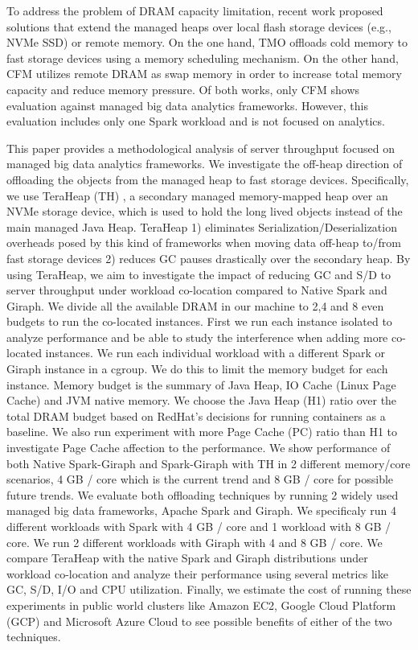 To address the problem of DRAM capacity limitation, recent work
proposed solutions that extend the managed heaps over local flash
storage devices (e.g., NVMe SSD) or remote memory. On the one hand,
TMO \cite{TMO} offloads cold memory to fast storage devices using
a memory scheduling mechanism. On the other hand, CFM \cite{CFM}
utilizes remote DRAM as swap memory in order to increase total memory capacity
and reduce memory pressure. Of both works, only CFM shows
evaluation against managed big data analytics frameworks. However, this evaluation
includes only one Spark workload and is not focused on analytics.

This paper provides a methodological analysis of server throughput 
focused on managed big data analytics frameworks.
We investigate the off-heap direction of offloading the objects from the
managed heap to fast storage devices.
Specifically, we use TeraHeap (TH) \cite{TeraHeap}, a secondary managed
memory-mapped heap over an NVMe storage device, which is used to hold
the long lived objects instead of the main managed Java Heap. TeraHeap
1) eliminates Serialization/Deserialization overheads posed by this
kind of frameworks when moving data off-heap to/from fast storage
devices 2) reduces GC pauses drastically over the secondary heap. By
using TeraHeap, we aim to investigate the impact of reducing GC and S/D
to server throughput under workload co-location compared to Native Spark
and Giraph. We divide all the available DRAM
in our machine to 2,4 and 8 even budgets to run the co-located instances.
First we run each instance isolated to analyze performance and be able to study the interference when adding more
co-located instances. We run each individual workload with a different Spark or Giraph instance in a cgroup.
We do this to limit the memory budget for each instance. Memory budget is
the summary of Java Heap, IO Cache (Linux Page Cache) and JVM native memory. We choose
the Java Heap (H1) ratio over the total DRAM budget based on RedHat's decisions
for running containers as a baseline. We also run experiment with more Page Cache (PC) ratio than H1
to investigate Page Cache affection to the performance. We show performance of both Native Spark-Giraph and Spark-Giraph with TH in 2 different
memory/core scenarios, 4 GB / core which is the current trend and 8 GB / core 
for possible future trends. We evaluate both offloading techniques by running 2 widely used
managed big data frameworks, Apache Spark and Giraph. We
specificaly run 4 different workloads with Spark with 4 GB / core and 1 workload with 8 GB / core.
We run 2 different workloads with Giraph with 4 and 8 GB / core.
We compare TeraHeap with the native Spark and Giraph distributions under workload
co-location and analyze their performance using several metrics like
GC, S/D, I/O and CPU utilization. Finally, we estimate the cost of running these
experiments in public world clusters like Amazon EC2, Google Cloud Platform (GCP)
and Microsoft Azure Cloud to see possible benefits of either of the two techniques.

